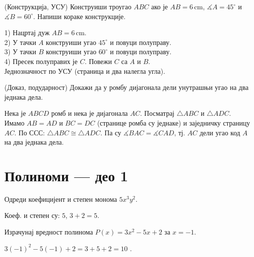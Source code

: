 \documentclass[11pt,a5paper,twoside,addpoints,noanswers]{exam} %
\newcommand{\measure}[2]{#1\,\mathrm{#2}}
\newcommand{\variant}[3]{#1}
\begin{document}
\begin{questions}
\ifprintanswers\else\newpage\fi

\question[4]
(Конструкција, УСУ) Конструиши троугао $ABC$ ако је
$AB=\measure{\variant{6}{5}{7}}{cm}$,
$\measuredangle A=\variant{45^\circ}{30^\circ}{60^\circ}$ и
$\measuredangle B=\variant{60^\circ}{75^\circ}{45^\circ}$.
Напиши кораке конструкције.
\begin{solution}[\stretch 3]
1) Нацртај дуж $AB=\measure{\variant{6}{5}{7}}{cm}$. \\
2) У тачки $A$ конструиши угао $\variant{45^\circ}{30^\circ}{60^\circ}$ и повуци полуправу. \\
3) У тачки $B$ конструиши угао $\variant{60^\circ}{75^\circ}{45^\circ}$ и повуци полуправу. \\
4) Пресек полуправих је $C$. Повежи $C$ са $A$ и $B$. \\
Једнозначност по УСУ (страница и два налегла угла).
\end{solution}

\question[4]
(Доказ, подударност) Докажи да у ромбу дијагонала дели унутрашњи угао на два једнака дела.
\begin{solution}[\stretch 3]
Нека је $ABCD$ ромб и нека је дијагонала $AC$.
Посматрај $\triangle ABC$ и $\triangle ADC$.
Имамо $AB=AD$ и $BC=DC$ (странице ромба су једнаке) и заједничку страницу $AC$.
По ССС: $\triangle ABC \cong \triangle ADC$.
Па су $\measuredangle BAC=\measuredangle CAD$, тј. $AC$ дели угао код $A$ на два једнака дела.
\end{solution}

\section*{Полиноми — део 1}

\question[2]
Одреди коефицијент и степен монома
$\variant{5x^3y^2}{-4a^2b}{\tfrac{1}{3}c}$.
\begin{solution}[\stretch 2]
Коеф. и степен су:
\variant{$5$, $3+2=5$}{\(-4\), \(2+1=3\)}{\(\tfrac{1}{3}\), \(1\)}.
\end{solution}

\question[2]
Израчунај вредност полинома
$P(x)=\variant{3x^2-5x+2}{-2x^3+4x-1}{2x^2-3x+1}$
за $x=\variant{-1}{2}{-1}$.
\begin{solution}[\stretch 2]
\variant{
$3(-1)^2-5(-1)+2=3+5+2=10$
}{
$-2\cdot 2^3+4\cdot 2-1=-16+8-1=-9$
}{
$2(-1)^2-3(-1)+1=2+3+1=6$
}.
\end{solution}


\end{questions}
\end{document}
